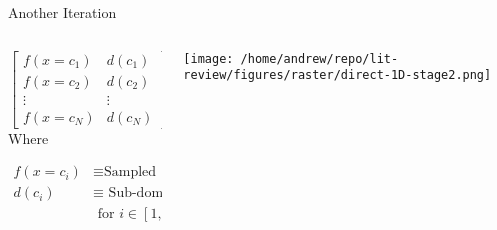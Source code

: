 \documentclass[presentation, aspectratio=1610]{beamer}
\begin{document}
\begin{frame}[label={sec:org1d410da}]{Another Iteration}
\begin{columns}
\begin{column}{0.4\columnwidth}
\begin{equation*}
  \begin{bmatrix}
    f(x=c_{1}) & d(c_{1})\\
    f(x=c_{2}) & d(c_{2})\\
    \vdots & \vdots \\
    f(x=c_{N}) & d(c_{N})
  \end{bmatrix}
\end{equation*}
Where

\begin{align*}
  f(x=c_{i}) &\equiv \text{Sampled function value} \\
  d(c_{i}) & \equiv \text{ Sub-domain size } \\
  & \text{ for } i \in [1,N]
\end{align*}
\end{column}

\begin{column}{0.6\columnwidth}
\begin{center}
\texttt{[image: /home/andrew/repo/lit-review/figures/raster/direct-1D-stage2.png]}
\end{center}
\end{column}
\end{columns}
\end{frame}
\end{document}
